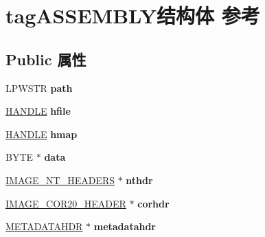 \hypertarget{structtag_a_s_s_e_m_b_l_y}{}\section{tag\+A\+S\+S\+E\+M\+B\+L\+Y结构体 参考}
\label{structtag_a_s_s_e_m_b_l_y}
\subsection*{Public 属性}
\begin{DoxyCompactItemize}
\item 
\mbox{\label{structtag_a_s_s_e_m_b_l_y_ad33832c003684b6d3fda2013ad92c579}} 
L\+P\+W\+S\+TR {\bfseries path}
\item 
\mbox{\label{structtag_a_s_s_e_m_b_l_y_a0f3daf310881ca772c8569963176e1d8}} 
\hyperlink{interfacevoid}{H\+A\+N\+D\+LE} {\bfseries hfile}
\item 
\mbox{\label{structtag_a_s_s_e_m_b_l_y_a8ae609e2732b521220e84f67be903262}} 
\hyperlink{interfacevoid}{H\+A\+N\+D\+LE} {\bfseries hmap}
\item 
\mbox{\label{structtag_a_s_s_e_m_b_l_y_afb4d183cb738c3fcc42d61e36072bf64}} 
B\+Y\+TE $\ast$ {\bfseries data}
\item 
\mbox{\label{structtag_a_s_s_e_m_b_l_y_ac1ff995e8d583561ce794e1aceda1e97}} 
\hyperlink{struct___i_m_a_g_e___n_t___h_e_a_d_e_r_s}{I\+M\+A\+G\+E\+\_\+\+N\+T\+\_\+\+H\+E\+A\+D\+E\+RS} $\ast$ {\bfseries nthdr}
\item 
\mbox{\label{structtag_a_s_s_e_m_b_l_y_a7f039ffd80137c8717ecd589df592c2b}} 
\hyperlink{struct_i_m_a_g_e___c_o_r20___h_e_a_d_e_r}{I\+M\+A\+G\+E\+\_\+\+C\+O\+R20\+\_\+\+H\+E\+A\+D\+ER} $\ast$ {\bfseries corhdr}
\item 
\mbox{\label{structtag_a_s_s_e_m_b_l_y_acc29d330c248367dc6f91de849a266d4}} 
\hyperlink{struct_m_e_t_a_d_a_t_a_h_d_r}{M\+E\+T\+A\+D\+A\+T\+A\+H\+DR} $\ast$ {\bfseries metadatahdr}
\item 
\mbox{\label{structtag_a_s_s_e_m_b_l_y_a4af0d501ca88e10b8ec09d3d71201583}} 

\end{DoxyCompactItemize}

